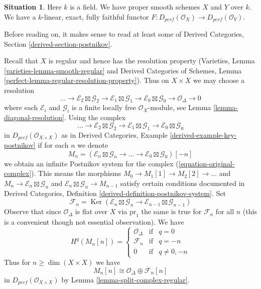 \documentclass{stacks-project}
\theoremstyle{plain}
\theoremstyle{definition}
\newtheorem{situation}[subsection]{Situation}
\theoremstyle{remark}
\numberwithin{equation}{subsection}
\def\Ker{\mathop{\mathrm{Ker}}}
\begin{document}
\begin{situation}
\label{situation-fully-faithful}
Here $k$ is a field. We have proper smooth schemes $X$ and $Y$ over $k$.
We have a $k$-linear, exact, fully faithful functor
$F : D_{perf}(\mathcal{O}_X) \to D_{perf}(\mathcal{O}_Y)$.
\end{situation}

\noindent
Before reading on, it makes sense to read at least some of
Derived Categories, Section \ref{derived-section-postnikov}.

\medskip\noindent
Recall that $X$ is regular and hence has the resolution property
(Varieties, Lemma \ref{varieties-lemma-smooth-regular} and
Derived Categories of Schemes, Lemma
\ref{perfect-lemma-regular-resolution-property}). Thus
on $X \times X$ we may choose a resolution
$$
\ldots \to
\mathcal{E}_2 \boxtimes \mathcal{G}_2 \to
\mathcal{E}_1 \boxtimes \mathcal{G}_1 \to
\mathcal{E}_0 \boxtimes \mathcal{G}_0 \to
\mathcal{O}_\Delta \to 0
$$
where each $\mathcal{E}_i$ and $\mathcal{G}_i$ is a finite locally
free $\mathcal{O}_X$-module, see Lemma \ref{lemma-diagonal-resolution}.
Using the complex
\begin{equation}
\label{equation-original-complex}
\ldots \to
\mathcal{E}_2 \boxtimes \mathcal{G}_2 \to
\mathcal{E}_1 \boxtimes \mathcal{G}_1 \to
\mathcal{E}_0 \boxtimes \mathcal{G}_0
\end{equation}
in $D_{perf}(\mathcal{O}_{X \times X})$ as in
Derived Categories, Example \ref{derived-example-key-postnikov}
if for each $n$ we denote
$$
M_n = (\mathcal{E}_n \boxtimes \mathcal{G}_n \to \ldots \to
\mathcal{E}_0 \boxtimes \mathcal{G}_0)[-n]
$$
we obtain an infinite Postnikov system for the complex
(\ref{equation-original-complex}). This means
the morphisms $M_0 \to M_1[1] \to M_2[2] \to \ldots$ and
$M_n \to \mathcal{E}_n \boxtimes \mathcal{G}_n$ and
$\mathcal{E}_n \boxtimes \mathcal{G}_n \to M_{n - 1}$
satisfy certain conditions documented in
Derived Categories, Definition \ref{derived-definition-postnikov-system}.
Set
$$
\mathcal{F}_n = \Ker(\mathcal{E}_n \boxtimes \mathcal{G}_n \to
\mathcal{E}_{n - 1} \boxtimes \mathcal{G}_{n - 1})
$$
Observe that since $\mathcal{O}_\Delta$ is flat over $X$ via $\text{pr}_1$
the same is true for $\mathcal{F}_n$ for all $n$ (this is a convenient though
not essential observation). We have
$$
H^q(M_n[n]) = \left\{
\begin{matrix}
\mathcal{O}_\Delta & \text{if} & q = 0 \\
\mathcal{F}_n & \text{if} & q = -n \\
0 & \text{if} & q \not = 0, -n
\end{matrix}
\right.
$$
Thus for $n \geq \dim(X \times X)$ we have
$$
M_n[n] \cong \mathcal{O}_\Delta \oplus \mathcal{F}_n[n]
$$
in $D_{perf}(\mathcal{O}_{X \times X})$ by
Lemma \ref{lemma-split-complex-regular}.
\end{document}
